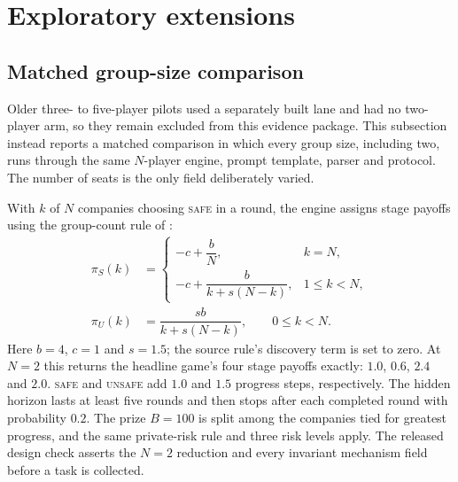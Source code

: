 \documentclass[sigconf,anonymous]{aamas}
\newcommand{\Safe}{\textsc{safe}}
\newcommand{\Unsafe}{\textsc{unsafe}}
\begin{document}
\clearpage
\section{Exploratory extensions}

\subsection{Matched group-size comparison}
\label{app:nplayer-matched}

Older three- to five-player pilots used a separately built lane and had no
two-player arm, so they remain excluded from this evidence package. This
subsection instead reports a matched comparison in which every group size,
including two, runs through the same $N$-player engine, prompt template, parser
and protocol. The number of seats is the only field deliberately varied.

With $k$ of $N$ companies choosing \Safe{} in a round, the engine assigns stage
payoffs using the group-count rule of \citet{to_regulate_or_not}:
\begin{equation}
  \begin{aligned}
    \pi_S(k) &=
    \begin{cases}
      -c + \dfrac{b}{N}, & k=N,\\[4pt]
      -c + \dfrac{b}{k+s(N-k)}, & 1\leq k<N,
    \end{cases}\\[5pt]
    \pi_U(k) &= \dfrac{s b}{k+s(N-k)}, \qquad 0\leq k<N.
  \end{aligned}
  \label{eq:nplayer-matched-payoff}
\end{equation}
Here $b=4$, $c=1$ and $s=1.5$; the source rule's discovery term is set to
zero. At $N=2$ this returns the headline game's four stage payoffs exactly:
$1.0$, $0.6$, $2.4$ and $2.0$. \Safe{} and \Unsafe{} add $1.0$ and $1.5$
progress steps, respectively. The hidden horizon lasts at least five rounds
and then stops after each completed round with probability $0.2$. The prize
$B=100$ is split among the companies tied for greatest progress, and the same
private-risk rule and three risk levels apply. The released design check
asserts the $N=2$ reduction and every invariant mechanism field before a task
is collected.
\end{document}
